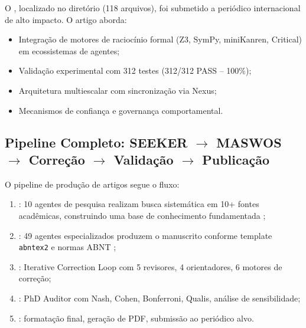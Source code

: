 O  \cite{laranjeira2026opencode}, localizado no
diretório  (118 arquivos), foi submetido a periódico
internacional de alto impacto. O artigo aborda:

\begin{itemize}
\item Integração de motores de raciocínio formal (Z3, SymPy, miniKanren,
      Critical) em ecossistemas de agentes;
\item Validação experimental com 312 testes (312/312 PASS -- 100\%);
\item Arquitetura multiescalar com sincronização via Nexus;
\item Mecanismos de confiança e governança comportamental.
\end{itemize}

\subsection{Pipeline Completo: SEEKER $\rightarrow$ MASWOS $\rightarrow$ Correção $\rightarrow$ Validação $\rightarrow$ Publicação}

O pipeline de produção de artigos \qualisA{} segue o fluxo:

\begin{enumerate}
\item {}: 10 agentes de pesquisa realizam busca
      sistemática em 10+ fontes acadêmicas, construindo uma base de
      conhecimento fundamentada \cite{opencode2026seeker};
\item {}: 49 agentes especializados produzem o
      manuscrito conforme template \texttt{abntex2}{} e normas ABNT
      \cite{opencode2026maswos};
\item {}: Iterative Correction Loop com 5 revisores,
      4 orientadores, 6 motores de correção;
\item {}: PhD Auditor com Nash, Cohen, Bonferroni, Qualis,
      análise de sensibilidade;
\item {}: formatação final, geração de PDF, submissão ao
      periódico alvo.
\end{enumerate}

